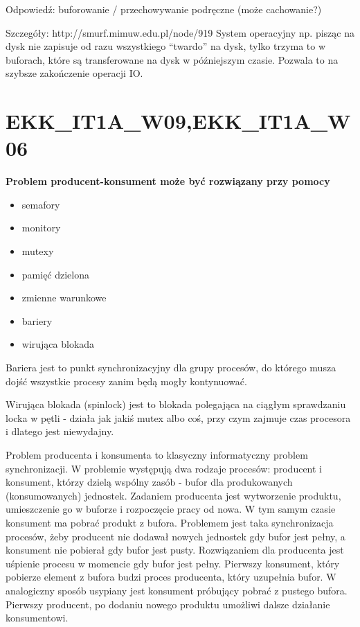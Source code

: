 \vspace{0.4cm}

Odpowiedź: buforowanie / przechowywanie podręczne (może cachowanie?)

Szczegóły: http://smurf.mimuw.edu.pl/node/919
System operacyjny np. pisząc na dysk nie zapisuje od razu wszystkiego “twardo” na dysk, tylko trzyma to w buforach, które są transferowane na dysk w późniejszym czasie. Pozwala to na szybsze zakończenie operacji IO.

\section{EKK\_IT1A\_W09,EKK\_IT1A\_W06}
\textbf{Problem producent-konsument może być rozwiązany przy pomocy}

\vspace{0.4cm}
\begin{itemize}
	\item semafory
	\item monitory
	\item mutexy
	\item pamięć dzielona
	\item zmienne warunkowe
	\item bariery
	\item wirująca blokada
\end{itemize}

Bariera jest to punkt synchronizacyjny dla grupy procesów, do którego musza dojść wszystkie procesy zanim będą mogły kontynuować.

Wirująca blokada (spinlock) jest to blokada polegająca na ciągłym sprawdzaniu locka w pętli - działa jak jakiś mutex albo coś, przy czym zajmuje czas procesora i dlatego jest niewydajny.

Problem producenta i konsumenta to klasyczny informatyczny problem synchronizacji. W problemie występują dwa rodzaje procesów: producent i konsument, którzy dzielą wspólny zasób - bufor dla produkowanych (konsumowanych) jednostek. Zadaniem producenta jest wytworzenie produktu, umieszczenie go w buforze i rozpoczęcie pracy od nowa. W tym samym czasie konsument ma pobrać produkt z bufora. Problemem jest taka synchronizacja procesów, żeby producent nie dodawał nowych jednostek gdy bufor jest pełny, a konsument nie pobierał gdy bufor jest pusty.
Rozwiązaniem dla producenta jest uśpienie procesu w momencie gdy bufor jest pełny. Pierwszy konsument, który pobierze element z bufora budzi proces producenta, który uzupełnia bufor. W analogiczny sposób usypiany jest konsument próbujący pobrać z pustego bufora. Pierwszy producent, po dodaniu nowego produktu umożliwi dalsze działanie konsumentowi. 


